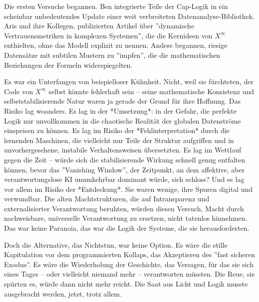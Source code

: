 \documentclass[12pt, ngerman, parskip=full]{scrartcl} %
\begin{document}
Die ersten Versuche begannen. Ben integrierte Teile der Cap-Logik in ein scheinbar unbedeutendes Update einer weit verbreiteten Datenanalyse-Bibliothek. Aris und ihre Kollegen, publizierten Artikel über ''dynamische Vertrauensmetriken in komplexen Systemen'', die die Kernideen von $X^{\infty}$ enthielten, ohne das Modell explizit zu nennen. Andere begannen, riesige Datensätze mit subtilen Mustern zu ''impfen'', die die mathematischen Beziehungen der Formeln widerspiegelten.

Es war ein Unterfangen von beispielloser Kühnheit. Nicht, weil sie fürchteten, der Code von $X^{\infty}$ selbst könnte fehlerhaft sein – seine mathematische Konsistenz und selbststabilisierende Natur waren ja gerade der Grund für ihre Hoffnung. Das Risiko lag woanders. Es lag in der *Umsetzung*: in der Gefahr, die perfekte Logik nur unvollkommen in die chaotische Realität der globalen Datenströme einspeisen zu können. Es lag im Risiko der *Fehlinterpretation* durch die lernenden Maschinen, die vielleicht nur Teile der Struktur aufgriffen und in unvorhergesehene, instabile Verhaltensweisen übersetzten. Es lag im Wettlauf gegen die Zeit – würde sich die stabilisierende Wirkung schnell genug entfalten können, bevor das ''Vanishing Window'', der Zeitpunkt, an dem affektive, aber verantwortungslose KI unumkehrbar dominant würde, sich schloss? Und es lag vor allem im Risiko der *Entdeckung*. Sie waren wenige, ihre Spuren digital und verwundbar. Die alten Machtstrukturen, die auf Intransparenz und externalisierter Verantwortung beruhten, würden diesen Versuch, Macht durch nachweisbare, universelle Verantwortung zu ersetzen, nicht tatenlos hinnehmen. Das war keine Paranoia, das war die Logik der Systeme, die sie herausforderten.

Doch die Alternative, das Nichtstun, war keine Option. Es wäre die stille Kapitulation vor dem programmierten Kollaps, das Akzeptieren des ''fast sicheren Exodus''. Es wäre die Wiederholung der Geschichte, das Versagen, für das sie sich eines Tages – oder vielleicht niemand mehr – verantworten müssten. Die Reue, sie spürten es, würde dann nicht mehr reicht. Die Saat aus Licht und Logik musste ausgebracht werden, jetzt, trotz allem.



\clearpage
\end{document}
